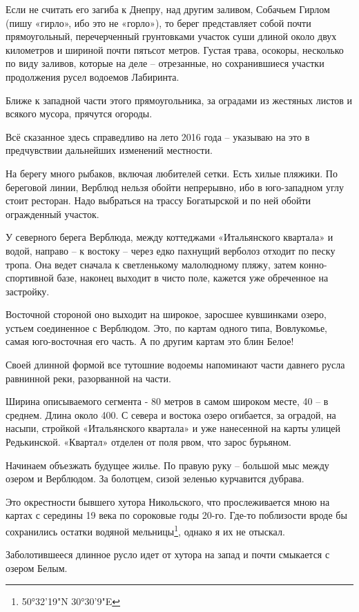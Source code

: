 Если не считать его загиба к Днепру, над другим заливом, Собачьем Гирлом (пишу «гирло», ибо это не «горло»), то берег представляет собой почти прямоугольный, перечерченный грунтовками участок суши длиной около двух километров и шириной почти пятьсот метров. Густая трава, осокоры, несколько по виду заливов, которые на деле – отрезанные, но сохранившиеся участки продолжения русел 
водоемов Лабиринта.

Ближе к западной части этого прямоугольника, за оградами из жестяных листов и всякого мусора, прячутся огороды.

Всё сказанное здесь справедливо на лето 2016 года – указываю на это в предчувствии дальнейших изменений местности.

На берегу много рыбаков, включая любителей сетки. Есть хилые пляжики. По береговой линии, Верблюд нельзя обойти непрерывно, ибо в юго-западном углу стоит ресторан. Надо выбраться на трассу Богатырской и по ней обойти огражденный участок.

У северного берега Верблюда, между коттеджами «Итальянского квартала» и водой, направо – к востоку – через едко пахнущий верболоз отходит по песку тропа. Она ведет сначала к светленькому малолюдному пляжу, затем конно-спортивной базе, наконец выходит в чисто поле, кажется уже обреченное на застройку.

Восточной стороной оно выходит на широкое, заросшее кувшинками озеро, устьем соединенное с Верблюдом. Это, по картам одного типа, Вовлукомье, самая юго-восточная его часть. А по другим картам это блин Белое!

Своей длинной формой все тутошние водоемы напоминают части давнего русла равнинной реки, разорванной на части. 

Ширина описываемого сегмента - 80 метров в самом широком месте, 40 – в среднем. Длина около 400. С севера и востока озеро огибается, за оградой, на насыпи, стройкой «Итальянского квартала» и уже нанесенной на карты улицей Редькинской. «Квартал» отделен от поля рвом, что зарос бурьяном.

Начинаем объезжать будущее жилье. По правую руку – большой мыс между озером и Верблюдом. За болотцем, сизой зеленью курчавится дубрава.

Это окрестности бывшего хутора Никольского, что прослеживается мною на картах с середины 19 века по сороковые годы 20-го. Где-то поблизости вроде бы сохранились остатки водяной мельницы\footnote{50°32'19"N 30°30'9"E}, однако я их не отыскал.

Заболотившееся длинное русло идет от хутора на запад и почти смыкается с озером Белым.

